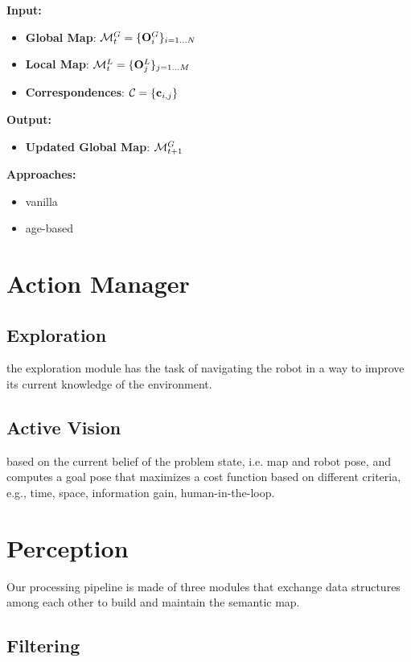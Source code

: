 \documentclass{article}
\begin{document}
	
	\hspace{1cm}
	
	\noindent
	{\bf Input: }
	\begin{itemize}
		\item {\bf Global Map}: $\mathcal{M}_t^G = \{ \mathbf{O}_i^G \}_{i=1 \dots N}$
		\item {\bf Local Map}: $\mathcal{M}_t^L = \{ \mathbf{O}_j^L \}_{j=1 \dots M}$
		\item {\bf Correspondences}: $\mathcal{C} = \{ \mathbf{c}_{i,j}\}$		
	\end{itemize}
	\noindent
	{\bf Output: }
	\begin{itemize}
		\item {\bf Updated Global Map}: $\mathcal{M}_{t+1}^G$
	\end{itemize}
	\noindent
	{\bf Approaches: }
	\begin{itemize}
		\item vanilla
		\item age-based
	\end{itemize}
		
	\section{Action Manager}
	
	\subsection{Exploration} the exploration module has the task of navigating the robot in a way to improve its current knowledge of the environment. 
	
	\subsection{Active Vision} based on the current belief of the problem state, i.e. map and robot pose, and computes a goal pose that maximizes a cost function based on different criteria, e.g., time, space, information gain, human-in-the-loop.
		
	\section{Perception}

	Our processing pipeline is made of three modules that exchange data structures among each other to build and maintain the semantic map.
	
	\subsection{Filtering}
	
\end{document}
